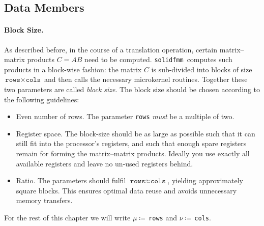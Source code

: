 \documentclass{scrbook}
\newcommand{\solidfmm}{\texttt{solidfmm}}
\begin{document}
\subsection{Data Members}\label{subsec:microkernel-data-members}
\paragraph{Block Size.}
As described before, in the course of a translation operation, certain
matrix--matrix products $C=AB$ need to be computed. \solidfmm\ computes such
products in a block-wise fashion: the matrix $C$ is sub-divided into blocks of
size  $\texttt{rows}\times\texttt{cols}$ and then calls the necessary
microkernel routines. Together these two parameters are called \emph{block
size}. The block size should be chosen according to the following guidelines:
\begin{itemize}
\item Even number of rows. The parameter \lstinline|rows| \emph{must} be a
multiple of two. 
\item Register space. The block-size should be as large as possible
such that it can still fit into the processor's registers, and such
that enough spare registers remain for forming the matrix--matrix
products. Ideally you use exactly all available registers and leave
no un-used registers behind.
\item Ratio. The parameters should fulfil $\texttt{rows}\approx\texttt{cols}$,
yielding approximately square blocks. This ensures optimal data reuse and
avoids unnecessary memory transfers.
\end{itemize}

For the rest of this chapter we will write $\mu\coloneqq$\,\lstinline|rows| and
$\nu\coloneqq$\,\lstinline|cols|.
\end{document}

